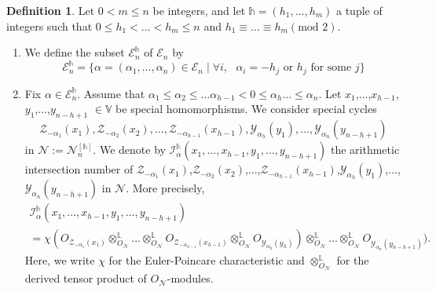 \documentclass[11pt,oneside]{amsart}
\theoremstyle{plain}
\theoremstyle{definition}
\newtheorem{definition}[theorem]{Definition}
\theoremstyle{remark}
\newcommand{\tx}[1]{\text{#1}}
\newcommand{\BL}{{\mathbb L}}
\newcommand{\BV}{{\mathbb V}}
\newcommand{\CE}{{\mathcal E}}
\newcommand{\CI}{{\mathcal I}}
\newcommand{\CN}{{\mathcal N}}
\newcommand{\CY}{{\mathcal Y}}
\newcommand{\CZ}{{\mathcal Z}}
\numberwithin{equation}{section}
\begin{document}
	\begin{definition}\label{definition3.3.10}
		Let $0 < m \leq n$ be integers, and let $\mathds{h}=(h_1,\dots,h_m)$ a tuple of integers such that $0\leq h_1<\dots<h_m \leq n$ and $h_1 \equiv \dots \equiv h_m (\tx{mod } 2)$.
		\begin{enumerate}
			\item We define the subset $\CE_n^{\mathds{h}}$ of $\CE_n$ by
			\begin{equation*}
				\CE_n^{\mathds{h}}=\lbrace \alpha=(\alpha_1,\dots,\alpha_n) \in \CE_n \mid \forall i, \tx{ }\alpha_i=-h_j \tx{ or }h_j \tx{ for some }j \rbrace 
			\end{equation*}
			
			\item Fix $\alpha \in \CE_n^{\mathds{h}}$. Assume that $\alpha_1 \leq \alpha_2\leq \dots \alpha_{h-1} < 0 \leq \alpha_h \dots \leq \alpha_n$. Let $x_1$,$\dots$,$x_{h-1}$,$y_1$,$\dots$,$y_{n-h+1}$ $\in \BV$ be special homomorphisms. We consider special cycles
			\begin{equation*}
				\CZ_{-\alpha_1}(x_1),\CZ_{-\alpha_2}(x_2),\dots,\CZ_{-\alpha_{h-1}}(x_{h-1}),\CY_{\alpha_h}(y_1),\dots,\CY_{\alpha_n}(y_{n-h+1})
			\end{equation*}
			in $\CN:=\CN_{n}^{[\mathds{h}]}$. We denote by $\CI_{\alpha}^{\mathds{h}}(x_1,\dots,x_{h-1},y_1,\dots,y_{n-h+1})$ the arithmetic intersection number of $\CZ_{-\alpha_1}(x_1)$,$\CZ_{-\alpha_2}(x_2)$,$\dots$,$\CZ_{-\alpha_{h-1}}(x_{h-1})$,$\CY_{\alpha_h}(y_1)$,$\dots$,$\CY_{\alpha_n}(y_{n-h+1})$ in $\CN$. More precisely,
			\begin{equation*}\begin{array}{ll}
					\CI_{\alpha}^{\mathds{h}}(x_1,\dots,x_{h-1},y_1,\dots,y_{n-h+1})\\
					=\chi(O_{\CZ_{-\alpha_1}(x_1)} \otimes_{O_{\CN}}^{\BL} \dots \otimes_{O_{\CN}}^{\BL} O_{\CZ_{-\alpha_{h-1}}(x_{h-1})} \otimes_{O_{\CN}}^{\BL} O_{\CY_{\alpha_h}(y_{h})}) \otimes_{O_{\CN}}^{\BL}\dots \otimes_{O_{\CN}}^{\BL} O_{\CY_{\alpha_n}(y_{n-h+1})}).
				\end{array}
			\end{equation*}
			Here, we write $\chi$ for the Euler-Poincare characteristic and $\otimes^{\BL}_{O_{\CN}}$ for the derived tensor product of $O_{\CN}$-modules.
			
		\end{enumerate}
	\end{definition}
	
\end{document}

